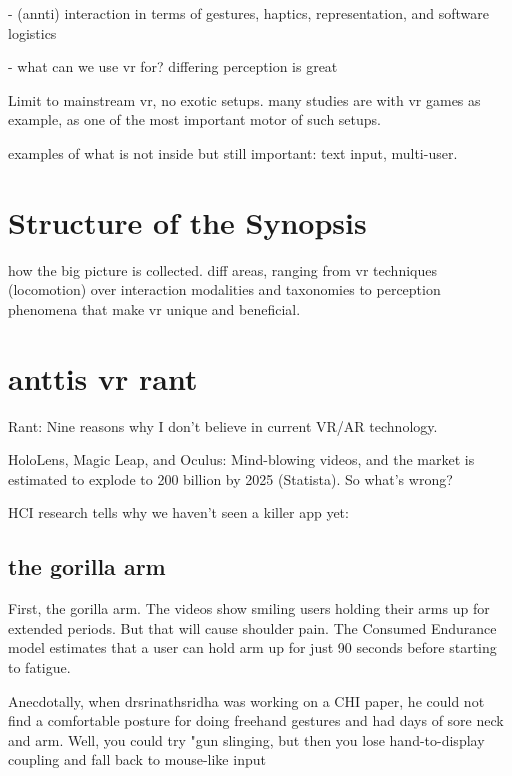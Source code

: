 - (annti) interaction in terms of gestures, haptics, representation, and software logistics


- what can we use vr for? differing perception is great


Limit to mainstream vr, no exotic setups.
many studies are with vr games as example, as one of the most important motor of such setups.


examples of what is not inside but still important: text input, multi-user.




\section{Structure of the Synopsis}

how the big picture is collected. diff areas, ranging from vr techniques (locomotion) over interaction modalities and taxonomies to perception phenomena that make vr unique and beneficial.



\section{anttis vr rant}

Rant: Nine reasons why I don't believe in current VR/AR technology.

HoloLens, Magic Leap, and Oculus: Mind-blowing videos, and the market is estimated to explode to 200 billion by 2025 (Statista). So what's wrong?

HCI research tells why we haven't seen a killer app yet:




\subsection{the gorilla arm}

First, the gorilla arm. The videos show smiling users holding their arms up for extended periods. But that will cause shoulder pain. The Consumed Endurance model estimates that a user can hold arm up for just 90 seconds before starting to fatigue. 

Anecdotally, when drsrinathsridha was working on a CHI paper, he could not find a comfortable posture for doing freehand gestures and had days of sore neck and arm. Well, you could try "gun slinging, but then you lose hand-to-display coupling and fall back to mouse-like input


